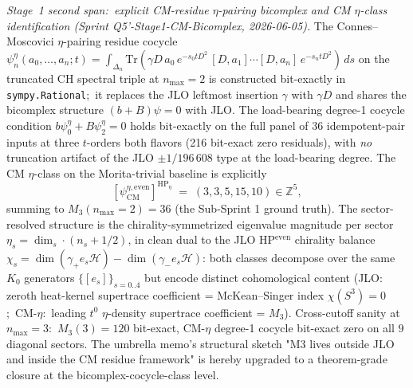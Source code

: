 \documentclass[11pt,a4paper]{article}
\theoremstyle{plain}
\theoremstyle{definition}
\newcommand{\Z}{\mathbb{Z}}
\begin{document}
\emph{Stage~1 second span:\ explicit CM-residue $\eta$-pairing
bicomplex and CM $\eta$-class identification (Sprint
Q5'-Stage1-CM-Bicomplex, 2026-06-05).}
The Connes--Moscovici $\eta$-pairing residue cocycle
$\psi_n^{\eta}(a_0, \dots, a_n; t)
= \int_{\Delta_n}\mathrm{Tr}(\gamma D\,a_0\,e^{-s_0 t D^2}\,
[D, a_1]\cdots[D, a_n]\,e^{-s_n t D^2})\,ds$ on the truncated CH
spectral triple at $n_{\max} = 2$ is constructed bit-exactly in
\texttt{sympy.Rational};\ it replaces the JLO leftmost insertion
$\gamma$ with $\gamma D$ and shares the bicomplex structure
$(b + B)\psi = 0$ with JLO.  The load-bearing degree-1 cocycle
condition $b\psi_0^{\eta} + B\psi_2^{\eta} = 0$ holds bit-exactly
on the full panel of $36$ idempotent-pair inputs at three
$t$-orders both flavors (216 bit-exact zero residuals), with
\emph{no} truncation artifact of the JLO $\pm 1/196\,608$ type at
the load-bearing degree.  The CM $\eta$-class on the Morita-trivial
baseline is explicitly
\[
   [\psi_{\mathrm{CM}}^{\eta, \mathrm{even}}]^{\mathrm{HP}_\eta}
   \;=\; (3, 3, 5, 15, 10) \in \Z^5,
\]
summing to $M_3(n_{\max} = 2) = 36$ (the Sub-Sprint 1 ground
truth).  The sector-resolved structure is the chirality-symmetrized
eigenvalue magnitude per sector $\eta_s = \dim_s \cdot (n_s + 1/2)$,
in clean dual to the JLO HP$^{\mathrm{even}}$ chirality balance
$\chi_s = \dim(\gamma_+ e_s \mathcal{H}) - \dim(\gamma_- e_s \mathcal{H})$:
both classes decompose over the same $K_0$ generators
$\{[e_s]\}_{s=0..4}$ but encode distinct cohomological content (JLO:
zeroth heat-kernel supertrace coefficient = McKean--Singer index
$\chi(S^3) = 0$;\ CM-$\eta$:\ leading $t^0$ $\eta$-density
supertrace coefficient = $M_3$).  Cross-cutoff sanity at
$n_{\max} = 3$:\ $M_3(3) = 120$ bit-exact, CM-$\eta$ degree-1
cocycle bit-exact zero on all $9$ diagonal sectors.  The umbrella
memo's structural sketch "M3 lives outside JLO and inside the CM
residue framework" is hereby upgraded to a theorem-grade closure
at the bicomplex-cocycle-class level.
\end{document}
